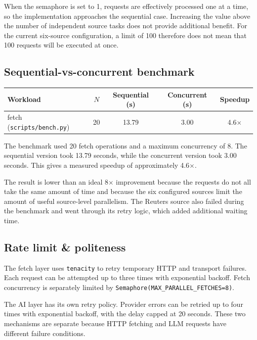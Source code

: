 \documentclass[11pt,a4paper]{article}
\begin{document}
When the semaphore is set to 1, requests are effectively processed one at a time, so the implementation approaches the sequential case. Increasing the value above the number of independent source tasks does not provide additional benefit. For the current six-source configuration, a limit of 100 therefore does not mean that 100 requests will be executed at once.

\subsection{Sequential-vs-concurrent benchmark}

\begin{center}
\small
\begin{tabular}{lcccc}
\toprule
\textbf{Workload} &
$N$ &
\textbf{Sequential (s)} &
\textbf{Concurrent (s)} &
\textbf{Speedup} \\
\midrule
fetch (\texttt{scripts/bench.py}) &
20 &
13.79 &
3.00 &
4.6$\times$ \\
\bottomrule
\end{tabular}
\end{center}

The benchmark used 20 fetch operations and a maximum concurrency of 8. The sequential version took 13.79 seconds, while the concurrent version took 3.00 seconds. This gives a measured speedup of approximately 4.6$\times$.

The result is lower than an ideal 8$\times$ improvement because the requests do not all take the same amount of time and because the six configured sources limit the amount of useful source-level parallelism. The Reuters source also failed during the benchmark and went through its retry logic, which added additional waiting time.

\subsection{Rate limit \& politeness}

The fetch layer uses \texttt{tenacity} to retry temporary HTTP and transport failures. Each request can be attempted up to three times with exponential backoff. Fetch concurrency is separately limited by \texttt{Semaphore(MAX\_PARALLEL\_FETCHES=8)}.

The AI layer has its own retry policy. Provider errors can be retried up to four times with exponential backoff, with the delay capped at 20 seconds. These two mechanisms are separate because HTTP fetching and LLM requests have different failure conditions.
\end{document}
